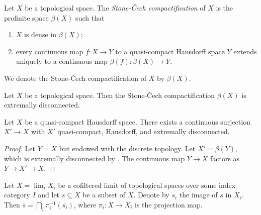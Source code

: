 \begin{definition} 
  \label{def:stone-cech-compactification}
  \mathlibok
  Let \(X\) be a topological space. The \emph{Stone-Čech compactification} of \(X\) is the
  profinite space \(\beta(X)\) such that
  \begin{enumerate}
    \item \(X\) is dense in \(\beta(X)\);
    \item every continuous map \(f: X \to Y\) to a quasi-compact Hausdorff space \(Y\)
        extends uniquely to a continuous map \(\beta(f): \beta(X) \to Y\).
  \end{enumerate}
  We denote the Stone-Čech compactification of \(X\) by \(\beta(X)\).
\end{definition}

\begin{theorem}
    Let \(X\) be a topological space. Then the Stone-Čech compactification \(\beta(X)\) is extremally disconnected.
    \label{thm:stone-cech-extremally-disconnected}
    \mathlibok
\end{theorem}

\begin{proposition}
  Let $X$ be a quasi-compact Hausdorff space. There exists a continuous surjection $X' \to X$ with $X'$ quasi-compact, Hausdorff, and extremally disconnected.
  \label{thm:extremally-disconnected-cover}
\end{proposition}

\begin{proof}
  Let $Y=X$ but endowed with the discrete topology. Let $X'=\beta (Y)$, which is extremally disconnected by . The continuous map $Y \to X$ factors as $Y \to X' \to X$.
\end{proof}

\begin{lemma}
  Let $X = \lim_i X_i$ be a cofiltered limit of topological spaces over some index category \(I\) and let
  $s \subseteq X$ be a subset of \(X\). Denote by $s_i$ the image of $s$ in $X_i$. Then
  $\overline{s} = \bigcap_i \pi_i^{-1} (\overline{s_i})$, where $\pi_i : X \to X_i$ is the projection map.
  \label{lemma:closure-limit-intersection}
  \leanok
\end{lemma}


